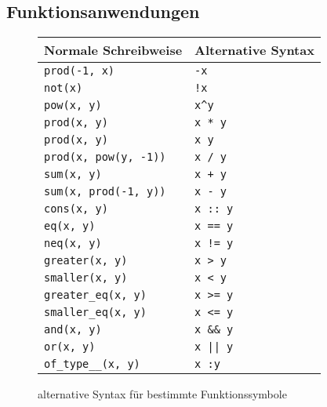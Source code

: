 \subsection{Funktionsanwendungen}
\begin{figure}
    \label{tabZucker}
    \centering
    \begin{tabular}{l l}
        \hline
        Normale Schreibweise & Alternative Syntax\\
        \hline \hline
        \verb|prod(-1, x)|         & \verb|-x|\\
        \verb|not(x)|              & \verb|!x|\\
        \verb|pow(x, y)|           & \verb|x^y|\\
        \verb|prod(x, y)|          & \verb|x * y|\\
        \verb|prod(x, y)|          & \verb|x y|\\
        \verb|prod(x, pow(y, -1))| & \verb|x / y|\\
        \verb|sum(x, y)|           & \verb|x + y|\\
        \verb|sum(x, prod(-1, y))| & \verb|x - y|\\
        \verb|cons(x, y)|          & \verb|x :: y|\\
        \verb|eq(x, y)|            & \verb|x == y|\\
        \verb|neq(x, y)|           & \verb|x != y|\\
        \verb|greater(x, y)|       & \verb|x > y|\\
        \verb|smaller(x, y)|       & \verb|x < y|\\
        \verb|greater_eq(x, y)|    & \verb|x >= y|\\
        \verb|smaller_eq(x, y)|    & \verb|x <= y|\\
        \verb|and(x, y)|           & \verb|x && y|\\
        \verb|or(x, y)|            & \verb!x || y!\\
        \verb|of_type__(x, y)|     & \verb|x :y|\\
        \hline
    \end{tabular}
    \caption{alternative Syntax für bestimmte Funktionssymbole}
\end{figure}

